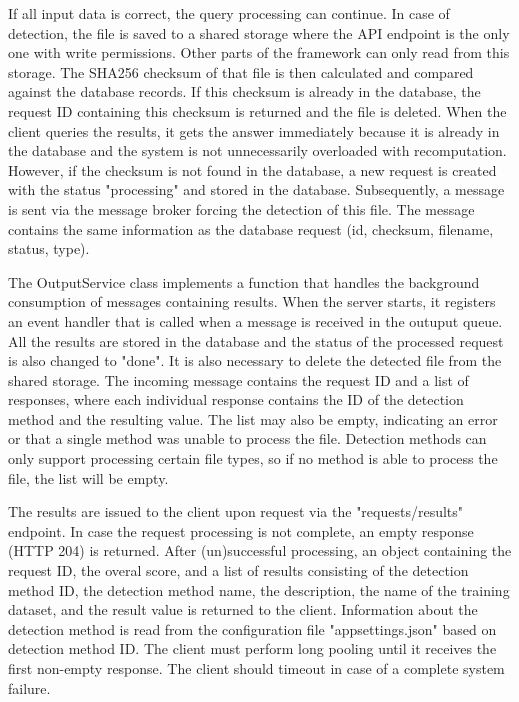 If all input data is correct, the query processing can continue. In case of detection, the file is saved to a shared storage where the API endpoint is the only one with write permissions. Other parts of the framework can only read from this storage. The SHA256 checksum of that file is then calculated and compared against the database records. If this checksum is already in the database, the request ID containing this checksum is returned and the file is deleted. When the client queries the results, it gets the answer immediately because it is already in the database and the system is not unnecessarily overloaded with recomputation. However, if the checksum is not found in the database, a new request is created with the status "processing" and stored in the database. Subsequently, a message is sent via the message broker forcing the detection of this file. The message contains the same information as the database request (id, checksum, filename, status, type).

The OutputService class implements a function that handles the background consumption of messages containing results. When the server starts, it registers an event handler that is called when a message is received in the outuput queue. All the results are stored in the database and the status of the processed request is also changed to "done". It is also necessary to delete the detected file from the shared storage. The incoming message contains the request ID and a list of responses, where each individual response contains the ID of the detection method and the resulting value. The list may also be empty, indicating an error or that a single method was unable to process the file. Detection methods can only support processing certain file types, so if no method is able to process the file, the list will be empty.

The results are issued to the client upon request via the "requests/results" endpoint. In case the request processing is not complete, an empty response (HTTP 204) is returned. After (un)successful processing, an object containing the request ID, the overal score, and a list of results consisting of the detection method ID, the detection method name, the description, the name of the training dataset, and the result value is returned to the client. Information about the detection method is read from the configuration file "appsettings.json" based on detection method ID. The client must perform long pooling until it receives the first non-empty response. The client should timeout in case of a complete system failure.

